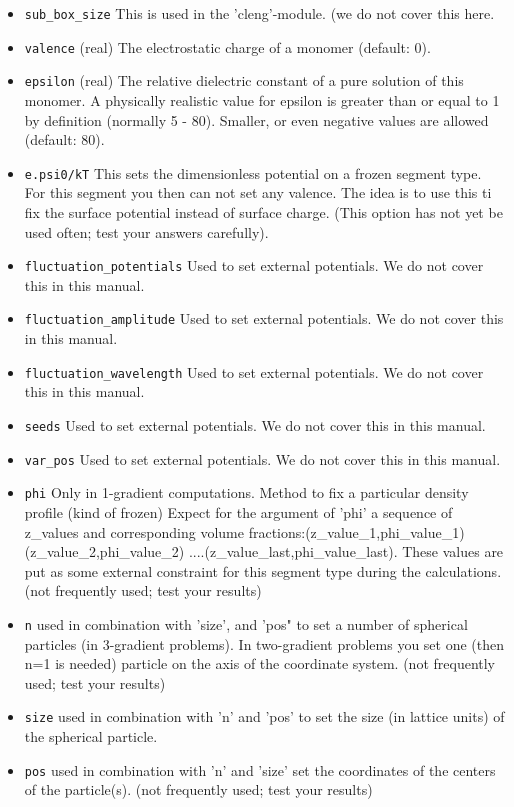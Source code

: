 \documentclass{article}
\begin{document}
\begin{itemize}
\item{\tt sub\_box\_size} This is used in the 'cleng'-module. (we do not cover this here.

\item {\tt valence} (real) The electrostatic charge of a monomer (default: 0). 

\item {\tt epsilon} (real) The relative dielectric constant of a pure solution of this monomer.  A physically realistic value for epsilon is greater than or equal to 1 by definition (normally 5 - 80).  Smaller, or even negative values are allowed (default: 80).

\item {\tt e.psi0/kT} This sets the dimensionless potential on a frozen segment type. For this segment you then can not set any valence. The idea is to use this ti fix the surface potential instead of surface charge. (This option has not yet be used often; test your answers carefully).

\item{\tt fluctuation\_potentials} Used to set external potentials. We do not cover this in this manual.
\item{\tt fluctuation\_amplitude} Used to set external potentials. We do not cover this in this manual.
\item{\tt fluctuation\_wavelength} Used to set external potentials. We do not cover this in this manual.
\item{\tt seeds} Used to set external potentials. We do not cover this in this manual.
\item{\tt var\_pos} Used to set external potentials. We do not cover this in this manual.

\item{\tt phi} Only in 1-gradient computations. Method to fix a particular density profile (kind of frozen) Expect for the argument of 'phi' a sequence of z\_values and corresponding volume fractions:(z\_value\_1,phi\_value\_1)(z\_value\_2,phi\_value\_2) ....(z\_value\_last,phi\_value\_last). These values are put as some external constraint for this segment type during the calculations. (not frequently used; test your results)
\item{\tt n} used in combination with 'size', and 'pos" to set a number of spherical particles (in 3-gradient problems). In two-gradient problems you set one (then n=1 is needed) particle on the axis of the coordinate system. (not frequently used; test your results)
\item{\tt size} used in combination with 'n' and 'pos' to set the size (in lattice units) of the spherical particle.
\item{\tt pos} used in combination with 'n' and 'size' set the coordinates of the centers of the particle(s). (not frequently used; test your results)
 

\end{itemize}
\end{document}
